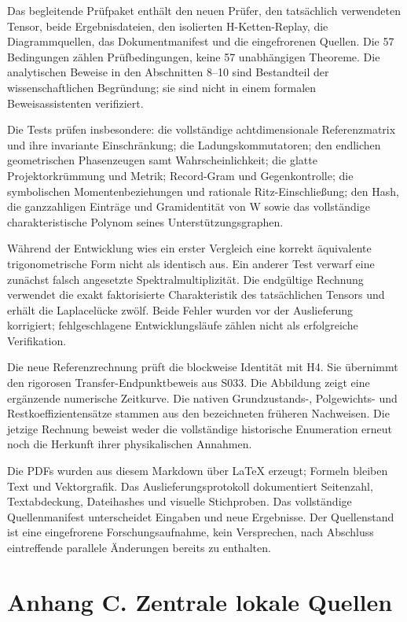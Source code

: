 Das begleitende Prüfpaket enthält den neuen Prüfer, den tatsächlich
verwendeten Tensor, beide Ergebnisdateien, den isolierten
H-Ketten-Replay, die Diagrammquellen, das Dokumentmanifest und die
eingefrorenen Quellen. Die 57 Bedingungen zählen Prüfbedingungen, keine
57 unabhängigen Theoreme. Die analytischen Beweise in den Abschnitten
8--10 sind Bestandteil der wissenschaftlichen Begründung; sie sind nicht
in einem formalen Beweisassistenten verifiziert.

Die Tests prüfen insbesondere: die vollständige achtdimensionale
Referenzmatrix und ihre invariante Einschränkung; die
Ladungskommutatoren; den endlichen geometrischen Phasenzeugen samt
Wahrscheinlichkeit; die glatte Projektorkrümmung und Metrik; Record-Gram
und Gegenkontrolle; die symbolischen Momentenbeziehungen und rationale
Ritz-Einschließung; den Hash, die ganzzahligen Einträge und
Gramidentität von W sowie das vollständige charakteristische Polynom
seines Unterstützungsgraphen.

Während der Entwicklung wies ein erster Vergleich eine korrekt
äquivalente trigonometrische Form nicht als identisch aus. Ein anderer
Test verwarf eine zunächst falsch angesetzte Spektralmultiplizität. Die
endgültige Rechnung verwendet die exakt faktorisierte Charakteristik des
tatsächlichen Tensors und erhält die Laplacelücke zwölf. Beide Fehler
wurden vor der Auslieferung korrigiert; fehlgeschlagene
Entwicklungsläufe zählen nicht als erfolgreiche Verifikation.

Die neue Referenzrechnung prüft die blockweise Identität mit H4. Sie
übernimmt den rigorosen Transfer-Endpunktbeweis aus S033. Die Abbildung
zeigt eine ergänzende numerische Zeitkurve. Die nativen Grundzustands-,
Polgewichts- und Restkoeffizientensätze stammen aus den bezeichneten
früheren Nachweisen. Die jetzige Rechnung beweist weder die vollständige
historische Enumeration erneut noch die Herkunft ihrer physikalischen
Annahmen.

Die PDFs wurden aus diesem Markdown über LaTeX erzeugt; Formeln bleiben
Text und Vektorgrafik. Das Auslieferungsprotokoll dokumentiert
Seitenzahl, Textabdeckung, Dateihashes und visuelle Stichproben. Das
vollständige Quellenmanifest unterscheidet Eingaben und neue Ergebnisse.
Der Quellenstand ist eine eingefrorene Forschungsaufnahme, kein
Versprechen, nach Abschluss eintreffende parallele Änderungen bereits zu
enthalten.

\section{Anhang C. Zentrale lokale
Quellen}\label{anhang-c.-zentrale-lokale-quellen}

